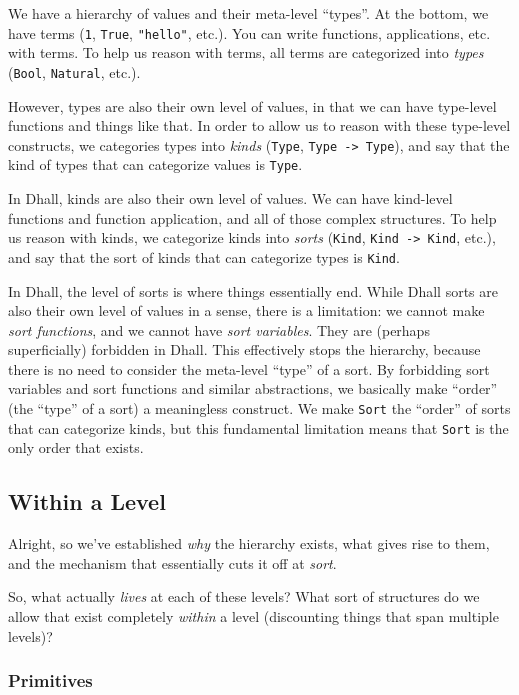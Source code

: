 \documentclass[]{article}
\begin{document}
We have a hierarchy of values and their meta-level ``types''. At the bottom, we
have terms (\texttt{1}, \texttt{True}, \texttt{"hello"}, etc.). You can write
functions, applications, etc. with terms. To help us reason with terms, all
terms are categorized into \emph{types} (\texttt{Bool}, \texttt{Natural}, etc.).

However, types are also their own level of values, in that we can have
type-level functions and things like that. In order to allow us to reason with
these type-level constructs, we categories types into \emph{kinds}
(\texttt{Type}, \texttt{Type\ -\textgreater{}\ Type}), and say that the kind of
types that can categorize values is \texttt{Type}.

In Dhall, kinds are also their own level of values. We can have kind-level
functions and function application, and all of those complex structures. To help
us reason with kinds, we categorize kinds into \emph{sorts} (\texttt{Kind},
\texttt{Kind\ -\textgreater{}\ Kind}, etc.), and say that the sort of kinds that
can categorize types is \texttt{Kind}.

In Dhall, the level of sorts is where things essentially end. While Dhall sorts
are also their own level of values in a sense, there is a limitation: we cannot
make \emph{sort functions}, and we cannot have \emph{sort variables}. They are
(perhaps superficially) forbidden in Dhall. This effectively stops the
hierarchy, because there is no need to consider the meta-level ``type'' of a
sort. By forbidding sort variables and sort functions and similar abstractions,
we basically make ``order'' (the ``type'' of a sort) a meaningless construct. We
make \texttt{Sort} the ``order'' of sorts that can categorize kinds, but this
fundamental limitation means that \texttt{Sort} is the only order that exists.

\hypertarget{within-a-level}{%
\subsection{Within a Level}\label{within-a-level}}

Alright, so we've established \emph{why} the hierarchy exists, what gives rise
to them, and the mechanism that essentially cuts it off at \emph{sort}.

So, what actually \emph{lives} at each of these levels? What sort of structures
do we allow that exist completely \emph{within} a level (discounting things that
span multiple levels)?

\hypertarget{primitives}{%
\subsubsection{Primitives}\label{primitives}}
\end{document}

